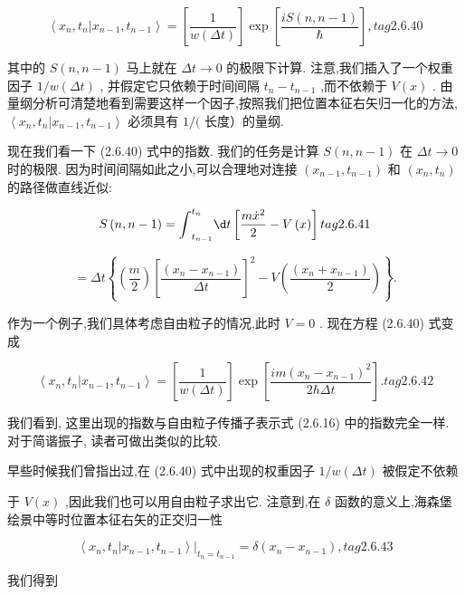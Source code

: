 \documentclass[lang=cn,newtx,10pt,scheme=chinese,thmcnt=section]{elegantbook}
\begin{document}
$$
\left\langle {{x}_{n},{t}_{n} | {x}_{n - 1},{t}_{n - 1}}\right\rangle = \left\lbrack \frac{1}{w\left( {\Delta t}\right) }\right\rbrack \exp \left\lbrack \frac{{iS}\left( {n, n - 1}\right) }{\hbar }\right\rbrack , tag{2. 6.40}
$$

其中的 $S\left( {n, n - 1}\right)$ 马上就在 ${\Delta t} \rightarrow 0$ 的极限下计算. 注意,我们插入了一个权重因子 $1/w\left( {\Delta t}\right)$ , 并假定它只依赖于时间间隔 ${t}_{n} - {t}_{n - 1}$ ,而不依赖于 $V\left( x\right)$ . 由量纲分析可清楚地看到需要这样一个因子,按照我们把位置本征右矢归一化的方法, $\left\langle {{x}_{n},{t}_{n} | {x}_{n - 1},{t}_{n - 1}}\right\rangle$ 必须具有 $1/($ 长度）的量纲.

现在我们看一下 (2.6.40) 式中的指数. 我们的任务是计算 $S\left( {n, n - 1}\right)$ 在 ${\Delta t} \rightarrow 0$ 时的极限. 因为时间间隔如此之小,可以合理地对连接 $\left( {{x}_{n - 1},{t}_{n - 1}}\right)$ 和 $\left( {{x}_{n},{t}_{n}}\right)$ 的路径做直线近似:

$$
S\left( {n, n - 1}\right) = {\int }_{{t}_{n - 1}}^{{t}_{n}}{\d t}\left\lbrack {\frac{m{\dot{x}}^{2}}{2} - V\left( x\right) }\right\rbrack tag{2.6.41}
$$

$$
= {\Delta t}\left\{ {\left( \frac{m}{2}\right) {\left\lbrack \frac{\left( {x}_{n} - {x}_{n - 1}\right) }{\Delta t}\right\rbrack }^{2} - V\left( \frac{\left( {x}_{n} + {x}_{n - 1}\right) }{2}\right) }\right\} .
$$

作为一个例子,我们具体考虑自由粒子的情况,此时 $V = 0$ . 现在方程 (2.6.40) 式变成

$$
\left\langle {{x}_{n},{t}_{n} | {x}_{n - 1},{t}_{n - 1}}\right\rangle = \left\lbrack \frac{1}{w\left( {\Delta t}\right) }\right\rbrack \exp \left\lbrack \frac{{im}{\left( {x}_{n} - {x}_{n - 1}\right) }^{2}}{2\hbar {\Delta t}}\right\rbrack . tag{2.6.42}
$$

我们看到, 这里出现的指数与自由粒子传播子表示式 (2.6.16) 中的指数完全一样. 对于简谐振子, 读者可做出类似的比较.

早些时候我们曾指出过,在 (2.6.40) 式中出现的权重因子 $1/w\left( {\Delta t}\right)$ 被假定不依赖

于 $V\left( x\right)$ ,因此我们也可以用自由粒子求出它. 注意到,在 $\delta$ 函数的意义上,海森堡绘景中等时位置本征右矢的正交归一性

$$
\left\langle {{x}_{n},{t}_{n} | {x}_{n - 1},{t}_{n - 1}}\right\rangle {\left. \right| }_{{t}_{n} = {t}_{n - 1}} = \delta \left( {{x}_{n} - {x}_{n - 1}}\right) , tag{2. 6.43}
$$

我们得到
\end{document}
